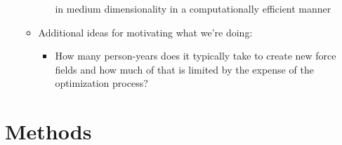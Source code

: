 \documentclass[aps,pre,nofootinbib,superscriptaddress,linenumbers,10pt, draft,tightenlines]{revtex4-1}
\begin{document}
\begin{itemize}
\begin{itemize}
\begin{itemize}
                  in medium dimensionality in a computationally efficient manner
        \end{itemize}
        \item Additional ideas for motivating what we're doing:
        \begin{itemize}
            \item How many person-years does it typically take to create new force fields and
                  how much of that is limited by the expense of the optimization process?
        \end{itemize}
    \end{itemize}
\end{itemize}
\section{Methods}
\end{document}
